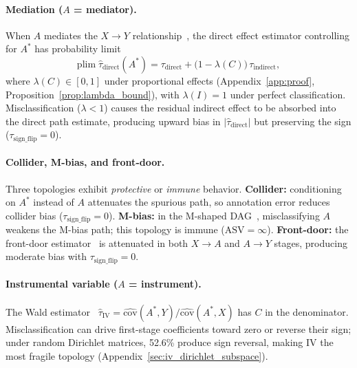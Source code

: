 \paragraph{Mediation ($A$ = mediator).}
When $A$ mediates the $X{\to}Y$ relationship~\cite{vanderweele2015explanation}, the direct effect estimator controlling for $A^*$ has probability limit
\begin{equation}
\label{eq:mediation}
\text{plim}\;\hat{\tau}_{\text{direct}}(A^*) = \tau_{\text{direct}} + \bigl(1 - \lambda(C)\bigr)\,\tau_{\text{indirect}},
\end{equation}
where $\lambda(C) \in [0,1]$ under proportional effects (Appendix~\ref{app:proof}, Proposition~\ref{prop:lambda_bound}), with $\lambda(I) = 1$ under perfect classification. Misclassification ($\lambda < 1$) causes the residual indirect effect to be absorbed into the direct path estimate, producing upward bias in $|\hat{\tau}_{\text{direct}}|$ but preserving the sign ($\tau_{\text{sign\_flip}} = 0$).

\paragraph{Collider, M-bias, and front-door.}
Three topologies exhibit \emph{protective} or \emph{immune} behavior. \textbf{Collider:} conditioning on $A^*$ instead of $A$ attenuates the spurious path, so annotation error reduces collider bias ($\tau_{\text{sign\_flip}} = 0$). \textbf{M-bias:} in the M-shaped DAG~\cite{greenland2003}, misclassifying $A$ weakens the M-bias path; this topology is immune ($\text{ASV} = \infty$). \textbf{Front-door:} the front-door estimator~\cite{bellemare_bloem2024} is attenuated in both $X \to A$ and $A \to Y$ stages, producing moderate bias with $\tau_{\text{sign\_flip}} = 0$.

\paragraph{Instrumental variable ($A$ = instrument).}
The Wald estimator~\cite{angrist_imbens1995} $\hat{\tau}_{\text{IV}} = \hat{\text{cov}}(A^*, Y) / \hat{\text{cov}}(A^*, X)$ has $C$ in the denominator. Misclassification can drive first-stage coefficients toward zero or reverse their sign; under random Dirichlet matrices, 52.6\% produce sign reversal, making IV the most fragile topology (Appendix~\ref{sec:iv_dirichlet_subspace}).

